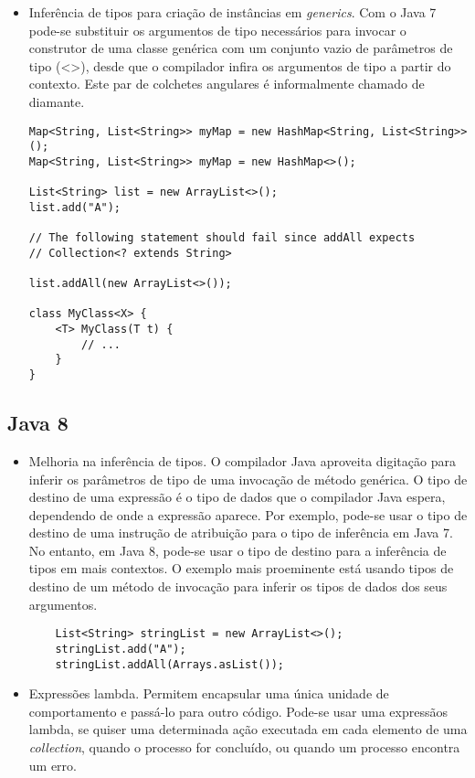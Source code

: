\begin{itemize}
\begin{lstlisting}
\end{lstlisting}
		  
		  \clearpage
		  \item Inferência de tipos para criação de instâncias em {\it generics}. Com o Java 7 pode-se substituir os argumentos de tipo necessários para invocar o construtor de uma classe genérica com um conjunto vazio de parâmetros de tipo (<>), desde que o compilador infira os argumentos de tipo a partir do contexto. Este par de colchetes angulares é informalmente chamado de diamante.
  
  

\begin{lstlisting}
Map<String, List<String>> myMap = new HashMap<String, List<String>>();
Map<String, List<String>> myMap = new HashMap<>();
	
List<String> list = new ArrayList<>();
list.add("A");
	
// The following statement should fail since addAll expects
// Collection<? extends String>
	
list.addAll(new ArrayList<>());
	
class MyClass<X> {
	<T> MyClass(T t) {
		// ...
	}
}
\end{lstlisting}
	 
	  \end{itemize}
	  
	  
	\subsection{Java 8}
	  \begin{itemize}
		  \item Melhoria na inferência de tipos. O compilador Java aproveita digitação para inferir os parâmetros de tipo de uma invocação de método genérica. O tipo de destino de uma expressão é o tipo de dados que o compilador Java espera, dependendo de onde a expressão aparece. Por exemplo, pode-se usar o tipo de destino de uma instrução de atribuição para o tipo de inferência em Java 7. No entanto, em Java 8, pode-se usar o tipo de destino para a inferência de tipos em mais contextos. O exemplo mais proeminente está usando tipos de destino de um método de invocação para inferir os tipos de dados dos seus argumentos.

\begin{lstlisting}
	List<String> stringList = new ArrayList<>();
	stringList.add("A");
	stringList.addAll(Arrays.asList());
\end{lstlisting}
		  
		  
		  \item Expressões lambda. Permitem encapsular uma única unidade de comportamento e passá-lo para outro código. Pode-se usar uma expressãos lambda, se quiser uma determinada ação executada em cada elemento de uma {\it collection}, quando o processo for concluído, ou quando um processo encontra um erro. \\
	  \end{itemize}

